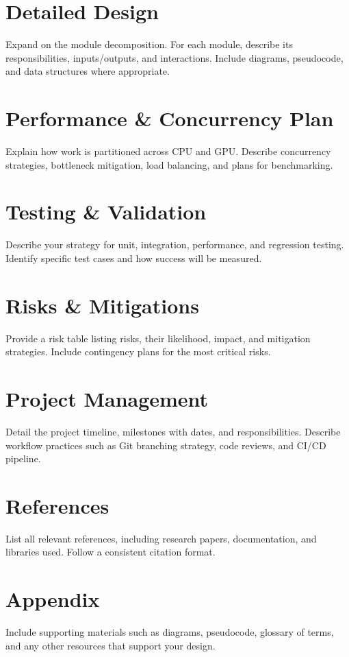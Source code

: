 \documentclass[12pt]{article}
\begin{document}
\section{Detailed Design}
Expand on the module decomposition. For each module, describe its responsibilities, inputs/outputs, and interactions. Include diagrams, pseudocode, and data structures where appropriate.

\section{Performance \& Concurrency Plan}
Explain how work is partitioned across CPU and GPU. Describe concurrency strategies, bottleneck mitigation, load balancing, and plans for benchmarking.

\section{Testing \& Validation}
Describe your strategy for unit, integration, performance, and regression testing. Identify specific test cases and how success will be measured.

\section{Risks \& Mitigations}
Provide a risk table listing risks, their likelihood, impact, and mitigation strategies. Include contingency plans for the most critical risks.

\section{Project Management}
Detail the project timeline, milestones with dates, and responsibilities. Describe workflow practices such as Git branching strategy, code reviews, and CI/CD pipeline.

\section{References}
List all relevant references, including research papers, documentation, and libraries used. Follow a consistent citation format.

\section{Appendix}
Include supporting materials such as diagrams, pseudocode, glossary of terms, and any other resources that support your design.
\end{document}
